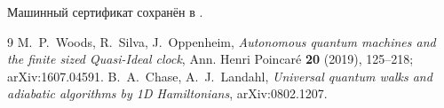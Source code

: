 Машинный сертификат сохранён в
.

\begin{thebibliography}{9}
M.~P.~Woods, R.~Silva, J.~Oppenheim,
\emph{Autonomous quantum machines and the finite sized Quasi-Ideal clock},
Ann. Henri Poincar\'e \textbf{20} (2019), 125--218;
arXiv:1607.04591.
B.~A.~Chase, A.~J.~Landahl,
\emph{Universal quantum walks and adiabatic algorithms by 1D Hamiltonians},
arXiv:0802.1207.
\end{thebibliography}